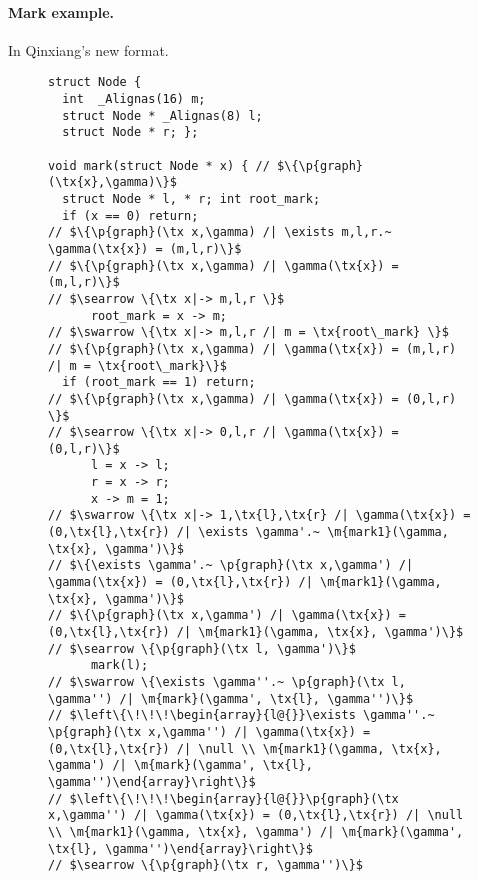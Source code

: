 \paragraph{Mark example.} In Qinxiang's new format.

\newcommand{\tx}[1]{\text{#1}}
\newcommand{\p}[1]{\ensuremath{\mathsf{#1}}} %
\newcommand{\m}[1]{\ensuremath{\mathit{#1}}} %
\let\ramify\lightning

\begin{figure}
  \begin{lstlisting}
struct Node {
  int  _Alignas(16) m;
  struct Node * _Alignas(8) l;
  struct Node * r; };

void mark(struct Node * x) { // $\{\p{graph}(\tx{x},\gamma)\}$
  struct Node * l, * r; int root_mark;
  if (x == 0) return;
// $\{\p{graph}(\tx x,\gamma) /| \exists m,l,r.~ \gamma(\tx{x}) = (m,l,r)\}$
// $\{\p{graph}(\tx x,\gamma) /| \gamma(\tx{x}) = (m,l,r)\}$
// $\searrow \{\tx x|-> m,l,r \}$
      root_mark = x -> m;
// $\swarrow \{\tx x|-> m,l,r /| m = \tx{root\_mark} \}$
// $\{\p{graph}(\tx x,\gamma) /| \gamma(\tx{x}) = (m,l,r) /| m = \tx{root\_mark}\}$
  if (root_mark == 1) return;
// $\{\p{graph}(\tx x,\gamma) /| \gamma(\tx{x}) = (0,l,r) \}$
// $\searrow \{\tx x|-> 0,l,r /| \gamma(\tx{x}) = (0,l,r)\}$
      l = x -> l;
      r = x -> r;
      x -> m = 1;
// $\swarrow \{\tx x|-> 1,\tx{l},\tx{r} /| \gamma(\tx{x}) = (0,\tx{l},\tx{r}) /| \exists \gamma'.~ \m{mark1}(\gamma, \tx{x}, \gamma')\}$
// $\{\exists \gamma'.~ \p{graph}(\tx x,\gamma') /| \gamma(\tx{x}) = (0,\tx{l},\tx{r}) /| \m{mark1}(\gamma, \tx{x}, \gamma')\}$
// $\{\p{graph}(\tx x,\gamma') /| \gamma(\tx{x}) = (0,\tx{l},\tx{r}) /| \m{mark1}(\gamma, \tx{x}, \gamma')\}$
// $\searrow \{\p{graph}(\tx l, \gamma')\}$
      mark(l);
// $\swarrow \{\exists \gamma''.~ \p{graph}(\tx l, \gamma'') /| \m{mark}(\gamma', \tx{l}, \gamma'')\}$
// $\left\{\!\!\!\begin{array}{l@{}}\exists \gamma''.~ \p{graph}(\tx x,\gamma'') /| \gamma(\tx{x}) = (0,\tx{l},\tx{r}) /| \null \\ \m{mark1}(\gamma, \tx{x}, \gamma') /| \m{mark}(\gamma', \tx{l}, \gamma'')\end{array}\right\}$
// $\left\{\!\!\!\begin{array}{l@{}}\p{graph}(\tx x,\gamma'') /| \gamma(\tx{x}) = (0,\tx{l},\tx{r}) /| \null \\ \m{mark1}(\gamma, \tx{x}, \gamma') /| \m{mark}(\gamma', \tx{l}, \gamma'')\end{array}\right\}$
// $\searrow \{\p{graph}(\tx r, \gamma'')\}$

\end{lstlisting}
\end{figure}
